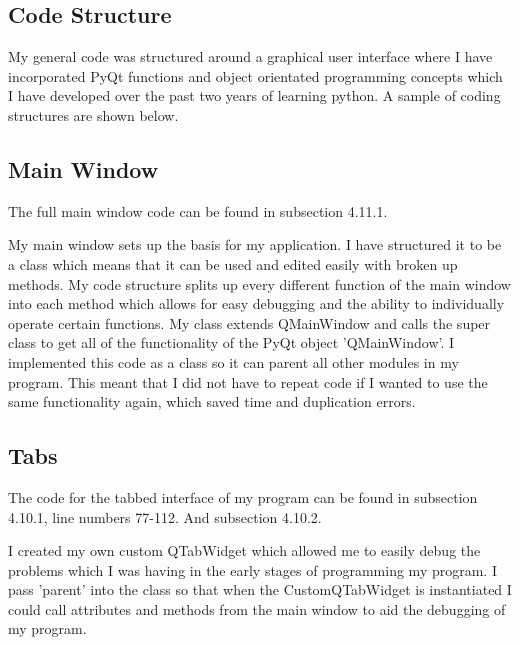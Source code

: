 \begin{landscape}

\section{Code Structure}

My general code was structured around a graphical user interface where I have incorporated PyQt functions and object orientated programming concepts which I have developed over the past two years of learning python. A sample of coding structures are shown below.


\subsection{Main Window}

The full main window code can be found in subsection 4.11.1.


My main window sets up the basis for my application. I have structured it to be a class which means that it can be used and edited easily with broken up methods. My code structure splits up every different function of the main window into each method which allows for easy debugging and the ability to individually operate certain functions. My class extends QMainWindow and calls the super class to get all of the functionality of the PyQt object 'QMainWindow'. I implemented this code as a class so it can parent all other modules in my program. This meant that I did not have to repeat code if I wanted to use the same functionality again, which saved time and duplication errors.


\subsection{Tabs}

The code for the tabbed interface of my program can be  found in subsection 4.10.1, line numbers 77-112. And subsection 4.10.2.


I created my own custom QTabWidget which allowed me to easily debug the problems which I was having in the early stages of programming my program. I pass 'parent' into the class so that when the CustomQTabWidget is instantiated I could call attributes and methods from the main window to aid the debugging of my program.



\end{landscape}
